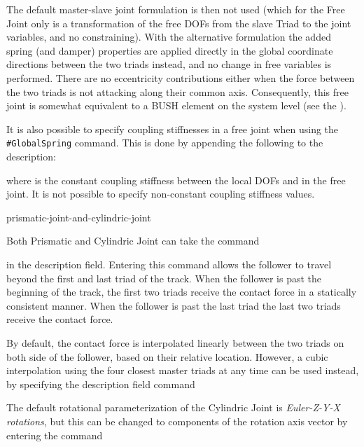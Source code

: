 
\noindent
The default master-slave joint formulation is then not used (which for
the Free Joint only is a transformation of the free DOFs from the slave
Triad to the joint variables, and no constraining). With the alternative
formulation the added spring (and damper) properties are applied
directly in the global coordinate directions between the two triads
instead, and no change in free variables is performed. There are no
eccentricity contributions either when the force between the two triads
is not attacking along their common axis. Consequently, this free joint
is somewhat equivalent to a BUSH element on the system level (see the
).

It is also possible to specify coupling stiffnesses in a free joint
when using the {\tt\#GlobalSpring} command.
This is done by appending the following to the description:


\noindent
where {\tt{}} is the constant coupling stiffness between
the local DOFs {\tt{}} and {\tt{}} in the free joint.
It is not possible to specify non-constant coupling stiffness values.


           {prismatic-joint-and-cylindric-joint}

Both Prismatic and Cylindric Joint can take the command


\noindent
in the description field. Entering this command allows the follower to
travel beyond the first and last triad of the track. When the follower
is past the beginning of the track, the first two triads receive the
contact force in a statically consistent manner. When the follower is
past the last triad the last two triads receive the contact force.

By default, the contact force is interpolated linearly between the two
triads on both side of the follower, based on their relative location.
However, a cubic interpolation using the four closest master triads at
any time can be used instead, by specifying the description field command


The default rotational parameterization of the Cylindric Joint is
{\sl Euler-Z-Y-X rotations}, but this can be changed to components of the
rotation axis vector by entering the command

